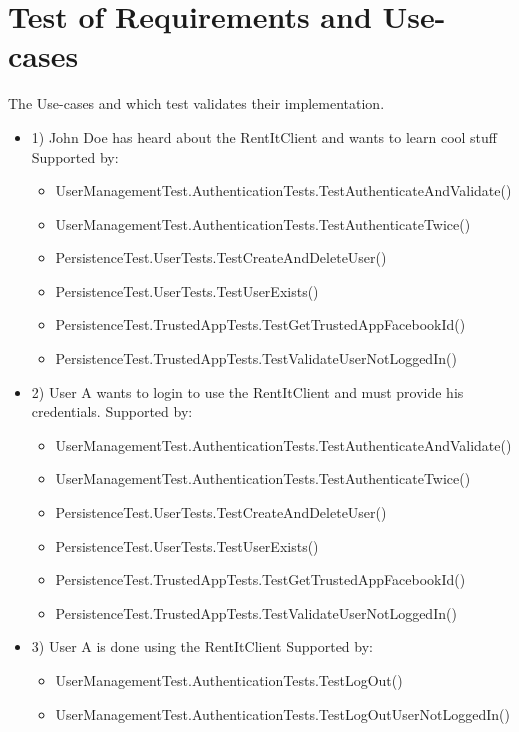 \section{Test of Requirements and Use-cases}

The Use-cases and which test validates their implementation.

\begin{itemize}
\item 1)
John Doe has heard about the RentItClient and wants to learn cool stuff
\newline Supported by:
\begin{itemize}
\item UserManagementTest.AuthenticationTests.TestAuthenticateAndValidate()
\item UserManagementTest.AuthenticationTests.TestAuthenticateTwice()
\item PersistenceTest.UserTests.TestCreateAndDeleteUser()
\item PersistenceTest.UserTests.TestUserExists()
\item PersistenceTest.TrustedAppTests.TestGetTrustedAppFacebookId()
\item PersistenceTest.TrustedAppTests.TestValidateUserNotLoggedIn()
\end{itemize}

\item 2)
User A wants to login to use the RentItClient and must provide his credentials.
\newline Supported by:
\begin{itemize}
\item UserManagementTest.AuthenticationTests.TestAuthenticateAndValidate()
\item UserManagementTest.AuthenticationTests.TestAuthenticateTwice()
\item PersistenceTest.UserTests.TestCreateAndDeleteUser()
\item PersistenceTest.UserTests.TestUserExists()
\item PersistenceTest.TrustedAppTests.TestGetTrustedAppFacebookId()
\item PersistenceTest.TrustedAppTests.TestValidateUserNotLoggedIn()
\end{itemize}

\item 3)
User A is done using the RentItClient
\newline Supported by:
\begin{itemize}
\item UserManagementTest.AuthenticationTests.TestLogOut()
\item UserManagementTest.AuthenticationTests.TestLogOutUserNotLoggedIn()
\end{itemize}


\end{itemize}
